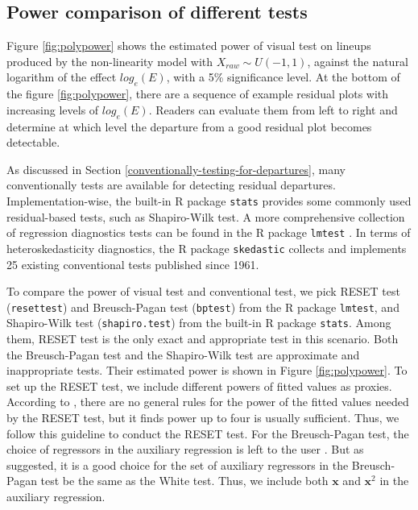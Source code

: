 \documentclass[]{interact}
\theoremstyle{plain}%
\theoremstyle{definition}
\theoremstyle{remark}
\begin{document}
\hypertarget{power-comparison-of-different-tests}{%
\subsection{Power comparison of different
tests}\label{power-comparison-of-different-tests}}

Figure \ref{fig:polypower} shows the estimated power of visual test on
lineups produced by the non-linearity model with
\(X_{raw} \sim U(-1,1)\), against the natural logarithm of the effect
\(log_e(E)\), with a 5\% significance level. At the bottom of the figure
\ref{fig:polypower}, there are a sequence of example residual plots with
increasing levels of \(log_e(E)\). Readers can evaluate them from left
to right and determine at which level the departure from a good residual
plot becomes detectable.

As discussed in Section \ref{conventionally-testing-for-departures},
many conventionally tests are available for detecting residual
departures. Implementation-wise, the built-in R package \texttt{stats}
provides some commonly used residual-based tests, such as Shapiro-Wilk
test. A more comprehensive collection of regression diagnostics tests
can be found in the R package \texttt{lmtest} \citep{lmtest}. In terms
of heteroskedasticity diagnostics, the R package \texttt{skedastic}
\citep{skedastic} collects and implements 25 existing conventional tests
published since 1961.

To compare the power of visual test and conventional test, we pick RESET
test (\texttt{resettest}) and Breusch-Pagan test (\texttt{bptest}) from
the R package \texttt{lmtest}, and Shapiro-Wilk test
(\texttt{shapiro.test}) from the built-in R package \texttt{stats}.
Among them, RESET test is the only exact and appropriate test in this
scenario. Both the Breusch-Pagan test and the Shapiro-Wilk test are
approximate and inappropriate tests. Their estimated power is shown in
Figure \ref{fig:polypower}. To set up the RESET test, we include
different powers of fitted values as proxies. According to
\citet{ramsey_tests_1969}, there are no general rules for the power of
the fitted values needed by the RESET test, but it finds power up to
four is usually sufficient. Thus, we follow this guideline to conduct
the RESET test. For the Breusch-Pagan test, the choice of regressors in
the auxiliary regression is left to the user
\citep{breusch_simple_1979}. But as \citet{waldman1983note} suggested,
it is a good choice for the set of auxiliary regressors in the
Breusch-Pagan test be the same as the White test. Thus, we include both
\(\boldsymbol{x}\) and \(\boldsymbol{x}^2\) in the auxiliary regression.
\end{document}
